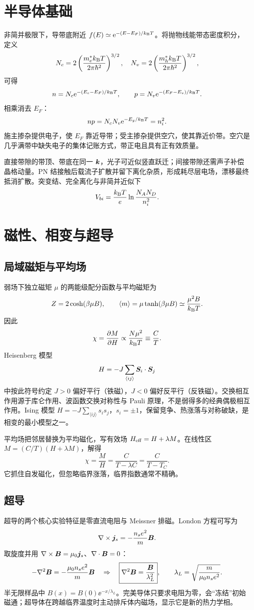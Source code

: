 \section{半导体基础}
非简并极限下，导带底附近
$f(E)\simeq\mathrm e^{-(E-E_F)/k_{\mathrm B} T}$。将抛物线能带态密度积分，定义
\[
N_c=2\left(\frac{m_e^*k_{\mathrm B} T}{2\pi\hbar^2}\right)^{3/2},\quad
N_v=2\left(\frac{m_h^*k_{\mathrm B} T}{2\pi\hbar^2}\right)^{3/2},
\]
可得
\[
n=N_c\mathrm e^{-(E_c-E_F)/k_{\mathrm B} T},\qquad
p=N_v\mathrm e^{-(E_F-E_v)/k_{\mathrm B} T}.
\]
相乘消去 $E_F$：
\[
np=N_cN_v\mathrm e^{-E_g/k_{\mathrm B} T}=n_i^2.
\]
施主掺杂提供电子，使 $E_F$ 靠近导带；受主掺杂提供空穴，使其靠近价带。空穴是几乎满带中缺失电子的集体记账方式，带正电且具有正有效质量。

直接带隙的带顶、带底在同一 $\bm{k}$，光子可近似竖直跃迁；间接带隙还需声子补偿晶格动量。PN 结接触后载流子扩散并留下离化杂质，形成耗尽层电场，漂移最终抵消扩散。突变结、完全离化与非简并近似下
\[
V_{bi}=\frac{k_{\mathrm B} T}{e}\ln\frac{N_AN_D}{n_i^2}.
\]

\section{磁性、相变与超导}
\subsection{局域磁矩与平均场}
弱场下独立磁矩 $\mu$ 的两能级配分函数与平均磁矩为
\[
Z=2\cosh(\beta\mu B),\qquad
\left\langle m\right\rangle=\mu\tanh(\beta\mu B)\simeq\frac{\mu^2B}{k_{\mathrm B} T}.
\]
因此
\[
\chi=\frac{\partial M}{\partial H}\propto\frac{N\mu^2}{k_{\mathrm B} T}
\equiv\frac CT.
\]
Heisenberg 模型
\[
H=-J\sum_{\langle ij\rangle}\bm{S}_i\cdot\bm{S}_j
\]
中按此符号约定 $J>0$ 偏好平行（铁磁），$J<0$ 偏好反平行（反铁磁）。交换相互作用源于库仑作用、波函数交换对称性与 Pauli 原理，不是弱得多的经典偶极相互作用。Ising 模型
$H=-J\sum_{\langle ij\rangle}s_is_j$，$s_i=\pm1$，保留竞争、热涨落与对称破缺，是相变的最小模型之一。

平均场把邻居替换为平均磁化，写有效场 $H_{\rm eff}=H+\lambda M$。在线性区
$M=(C/T)(H+\lambda M)$，解得
\[
\boxed{\chi=\frac{M}{H}=\frac{C}{T-\lambda C}
=\frac{C}{T-T_C}}.
\]
它抓住自发磁化，但忽略临界涨落，临界指数通常不精确。

\subsection{超导}
超导的两个核心实验特征是零直流电阻与 Meissner 排磁。London 方程可写为
\[
\nabla\times\bm{j}_s=-\frac{n_se^2}{m}\bm{B}.
\]
取旋度并用 $\nabla\times\bm{B}=\mu_0\bm{j}_s$、$\nabla\cdot\bm{B}=0$：
\[
-\nabla^2\bm{B}=-\frac{\mu_0n_se^2}{m}\bm{B}
\quad\Rightarrow\quad
\boxed{\nabla^2\bm{B}=\frac{\bm{B}}{\lambda_L^2}},\qquad
\lambda_L=\sqrt{\frac{m}{\mu_0n_se^2}}.
\]
半无限样品中 $B(x)=B(0)\ee^{-x/\lambda_L}$。完美导体只要求电阻为零，会“冻结”初始磁通；超导体在跨越临界温度时主动排斥体内磁场，显示它是新的热力学相。

